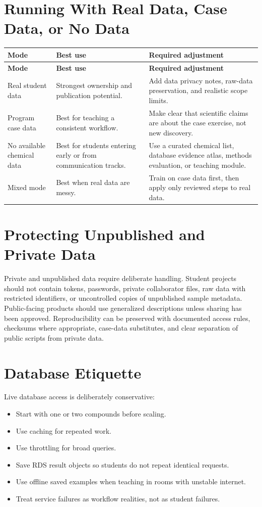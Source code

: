 \section{Running With Real Data, Case Data, or No Data}
\begin{longtable}{p{}p{}p{}}
\toprule
\textbf{Mode} & \textbf{Best use} & \textbf{Required adjustment}\\
\midrule
\endfirsthead
\toprule
\textbf{Mode} & \textbf{Best use} & \textbf{Required adjustment}\\
\midrule
\endhead
Real student data & Strongest ownership and publication potential. & Add data privacy notes, raw-data preservation, and realistic scope limits.\\
Program case data & Best for teaching a consistent workflow. & Make clear that scientific claims are about the case exercise, not new discovery.\\
No available chemical data & Best for students entering early or from communication tracks. & Use a curated chemical list, database evidence atlas, methods evaluation, or teaching module.\\
Mixed mode & Best when real data are messy. & Train on case data first, then apply only reviewed steps to real data.\\
\bottomrule
\end{longtable}

\section{Protecting Unpublished and Private Data}
Private and unpublished data require deliberate handling. Student projects should not contain tokens, passwords, private collaborator files, raw data with restricted identifiers, or uncontrolled copies of unpublished sample metadata. Public-facing products should use generalized descriptions unless sharing has been approved. Reproducibility can be preserved with documented access rules, checksums where appropriate, case-data substitutes, and clear separation of public scripts from private data.

\section{Database Etiquette}
Live database access is deliberately conservative:
\begin{itemize}
  \item Start with one or two compounds before scaling.
  \item Use caching for repeated work.
  \item Use throttling for broad queries.
  \item Save RDS result objects so students do not repeat identical requests.
  \item Use offline saved examples when teaching in rooms with unstable internet.
  \item Treat service failures as workflow realities, not as student failures.
\end{itemize}

